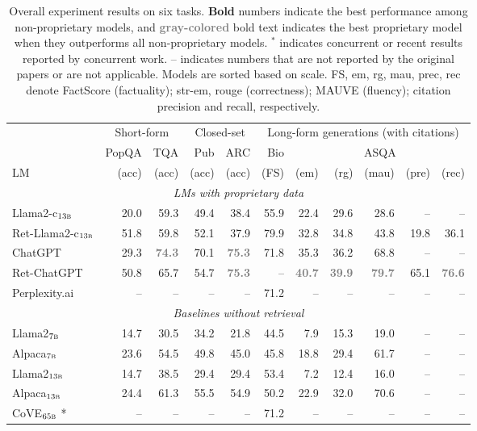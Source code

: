 \documentclass{article} %
\begin{document}
\begin{table}[t!]
\centering
\footnotesize
    \caption{
    Overall experiment results on six tasks. {\bf Bold} numbers indicate the best performance among non-proprietary models, and \textcolor{gray}{\bf gray-colored} bold text indicates the best proprietary model when they outperforms all non-proprietary models.  
    $^*$ indicates concurrent or recent results reported by concurrent work.  -- indicates numbers that are not reported by the original papers or are not applicable. Models are sorted based on scale. FS, em, rg, mau, prec, rec denote FactScore (factuality); str-em, rouge (correctness); MAUVE (fluency); citation precision and recall, respectively. 
    }
    \label{tab:main}
\begin{tabular}{lrrrrrrrrrr}\toprule
&\multicolumn{2}{c}{Short-form} & \multicolumn{2}{c}{Closed-set} & \multicolumn{6}{c}{Long-form generations (with citations)}     \\
& PopQA & TQA &  Pub & ARC &  Bio  &\multicolumn{5}{c}{ASQA} \\ 
LM & (acc) & (acc) & (acc) & (acc) & (FS) & (em) & (rg) & (mau) & (pre) & (rec) \\
\midrule
\multicolumn{11}{c}{\it LMs with proprietary data } \\
Llama2-c$_{\textsc{13b}}$  & 20.0 & 59.3 & 49.4 & 38.4 & 55.9 & 22.4 & 29.6 & 28.6 & -- & -- \\
Ret-Llama2-c$_{\textsc{13b}}$  & 51.8  & 59.8& 52.1 & 37.9 &  {79.9} & 32.8 & 34.8 & 43.8 & 19.8& 36.1 \\
ChatGPT  & 29.3 &   \textcolor{gray}{\bf 74.3} & 70.1 &  \textcolor{gray}{\bf 75.3}  & 71.8 & 35.3  & 36.2  & 68.8 & -- & --\\ 
Ret-ChatGPT &  50.8 & 65.7 &  54.7 & \textcolor{gray}{\bf 75.3} & -- & \textcolor{gray}{\bf 40.7} &  \textcolor{gray}{\bf 39.9} & \textcolor{gray}{\bf 79.7} & {65.1} & \textcolor{gray}{\bf 76.6}  \\
Perplexity.ai &  -- & -- & -- & -- & 71.2 & -- &  -- & -- & -- &--  \\ \midrule
\multicolumn{11}{c}{\it Baselines without retrieval} \\
Llama2$_{\textsc{7b}}$ & 14.7 & 30.5 & 34.2 & 21.8  & 44.5  & 7.9 & 15.3&19.0 & -- & --  \\
Alpaca$_{\textsc{7b}}$  &  23.6 & 54.5  & 49.8 &45.0 & 45.8 & 18.8 & 29.4 & 61.7 & -- & --  \\
Llama2$_{\textsc{13b}}$   &  14.7 & 38.5  & 29.4 & 29.4 & 53.4 & 7.2 & 12.4 & 16.0  & -- & -- \\
Alpaca$_{\textsc{13b}}$ &  24.4  &  61.3  & 55.5  & 54.9 & 50.2 & 22.9 &  32.0&  70.6 & -- & -- \\
CoVE$_{\textsc{65b}}$ * &  -- & -- & -- & -- & 71.2  & --  & -- & -- & -- & -- \\  
\midrule


\end{tabular}
\end{table}
\end{document}
